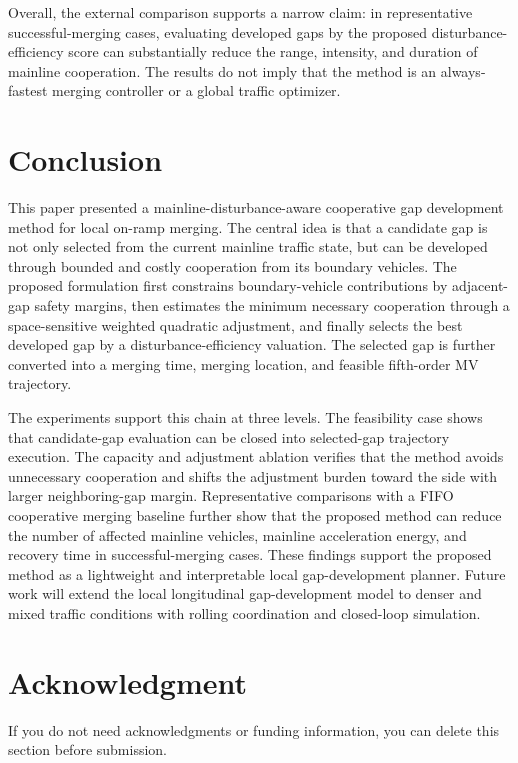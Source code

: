 \documentclass[conference]{IEEEtran}
\begin{document}
\begin{table}[t]
\caption{Merge-Placement and Spacing Context}
\label{tab:merge_context}
\centering
\scriptsize
{}
\end{table}

Overall, the external comparison supports a narrow claim: in representative
successful-merging cases, evaluating developed gaps by the proposed
disturbance-efficiency score can substantially reduce the range, intensity, and
duration of mainline cooperation. The results do not imply that the method is
an always-fastest merging controller or a global traffic optimizer.

\section{Conclusion}
This paper presented a mainline-disturbance-aware cooperative gap development
method for local on-ramp merging. The central idea is that a candidate gap is
not only selected from the current mainline traffic state, but can be developed
through bounded and costly cooperation from its boundary vehicles. The proposed
formulation first constrains boundary-vehicle contributions by adjacent-gap
safety margins, then estimates the minimum necessary cooperation through a
space-sensitive weighted quadratic adjustment, and finally selects the best
developed gap by a disturbance-efficiency valuation. The selected gap is further
converted into a merging time, merging location, and feasible fifth-order MV
trajectory.

The experiments support this chain at three levels. The feasibility case shows
that candidate-gap evaluation can be closed into selected-gap trajectory
execution. The capacity and adjustment ablation verifies that the method avoids
unnecessary cooperation and shifts the adjustment burden toward the side with
larger neighboring-gap margin. Representative comparisons with a FIFO
cooperative merging baseline further show that the proposed method can reduce
the number of affected mainline vehicles, mainline acceleration energy, and
recovery time in successful-merging cases. These findings support the proposed
method as a lightweight and interpretable local gap-development planner. Future
work will extend the local longitudinal gap-development model to denser and
mixed traffic conditions with rolling coordination and closed-loop simulation.

\section*{Acknowledgment}
If you do not need acknowledgments or funding information, you can delete this
section before submission.



\end{document}
